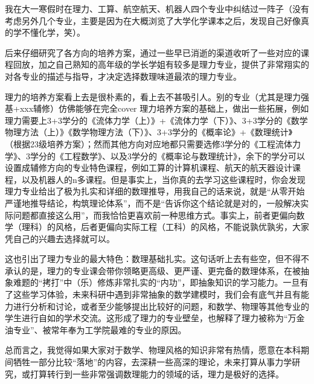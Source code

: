 我在大一寒假时在理力、工算、航空航天、机器人四个专业中纠结过一阵子（没有考虑另外几个专业，主要是因为在大概浏览了大学化学课本之后，发现自己好像真的学不懂化学，笑）。

\vspace{10pt}

后来仔细研究了各方向的培养方案，通过一些早已消逝的渠道收听了一些对应的课程回放，加之自己熟知的高年级的学长学姐有较多是理力专业，提供了非常翔实的对各专业的描述与指导，才决定选择数理味道最浓的理力专业。

\vspace{10pt}

理力的培养方案看上去是很朴素的，看上去不甚吸引人。别的专业（尤其是理力强基+xxx辅修）仿佛能够在完全cover 理力培养方案的基础上，做出一些拓展，例如理力需要上3+3学分的《流体力学（上）》+《流体力学（下）》、3+3学分的《数学物理方法（上）》《数学物理方法（下）》、3+3学分的《概率论》+《数理统计》（根据23级培养方案）；然而其他方向对应地都只需要选修3学分的《工程流体力学》、3学分的《工程数学》、以及3学分的《概率论与数理统计》，余下的学分可以设置成辅修方向的专业特色课程，例如工算的计算机课程、航天的航天器设计课程，以及机器人的n多课程。但是事实上，当你真的去学习这些课程时，你会发现理力专业给出了极为扎实和详细的数理推导，用我自己的话来说，就是“从零开始严谨地推导结论，构筑理论体系”，而不是“告诉你这个结论就是对的，一般解决实际问题都直接这么用”，而我恰恰更喜欢前一种思维方式。事实上，前者更偏向数学（理科）的风格，后者更偏向实际工程（工科）的风格，不能说孰优孰劣，大家凭自己的兴趣去选择就可以。

\vspace{10pt}

这也引出了理力专业的最大特色：数理基础扎实。这句话听上去有些空，但不得不承认的是，理力的专业课会带你领略更高级、更严谨、更完备的数理体系，在被抽象难题的“拷打”中（乐）修炼非常扎实的“内功”，即抽象知识的学习能力。一旦有了这些学习体验，未来科研中遇到非常抽象的数学建模时，我们会有底气并且有能力进行分析和讨论，或者至少能够提出比较好的问题，和数学、物理等其他专业的学生进行自如的学术交流。这形成了理力的专业壁垒，也解释了理力被称为“万金油专业”、被常年奉为工学院最难的专业的原因。

\vspace{10pt}

总而言之，我觉得如果大家对于数学、物理风格的知识非常有热情，愿意在本科期间牺牲一部分比较“落地”的内容，去深耕一些高深的理论，未来打算从事力学研究，或打算转行到一些非常强调数理能力的领域的话，理力是极好的选择。

\vspace{10pt}

